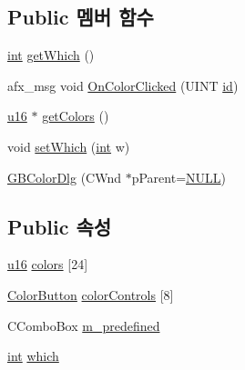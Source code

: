 \subsection*{Public 멤버 함수}
\begin{DoxyCompactItemize}
\item 
\mbox{\hyperlink{_util_8cpp_a0ef32aa8672df19503a49fab2d0c8071}{int}} \mbox{\hyperlink{class_g_b_color_dlg_a8f4e8dbf15d1f2d1bab9df384ebf484e}{get\+Which}} ()
\item 
afx\+\_\+msg void \mbox{\hyperlink{class_g_b_color_dlg_a244aa29f38fa1e813aca166ba63982c6}{On\+Color\+Clicked}} (U\+I\+NT \mbox{\hyperlink{_commands_8cpp_a7b7a6396b2c82ad46c6d8b2bf141a8dd}{id}})
\item 
\mbox{\hyperlink{_system_8h_a9e6c91d77e24643b888dbd1a1a590054}{u16}} $\ast$ \mbox{\hyperlink{class_g_b_color_dlg_ab3fe3dff45003cb0483ad90eb42a3052}{get\+Colors}} ()
\item 
void \mbox{\hyperlink{class_g_b_color_dlg_a1e00eaaeaf344a830f1dd5692e26af1d}{set\+Which}} (\mbox{\hyperlink{_util_8cpp_a0ef32aa8672df19503a49fab2d0c8071}{int}} w)
\item 
\mbox{\hyperlink{class_g_b_color_dlg_a57ebd7e910414cd9c33725faf038afcb}{G\+B\+Color\+Dlg}} (C\+Wnd $\ast$p\+Parent=\mbox{\hyperlink{_system_8h_a070d2ce7b6bb7e5c05602aa8c308d0c4}{N\+U\+LL}})
\end{DoxyCompactItemize}
\subsection*{Public 속성}
\begin{DoxyCompactItemize}
\item 
\mbox{\hyperlink{_system_8h_a9e6c91d77e24643b888dbd1a1a590054}{u16}} \mbox{\hyperlink{class_g_b_color_dlg_a24de2e906e28d7b4a006d68d6c8afeee}{colors}} \mbox{[}24\mbox{]}
\item 
\mbox{\hyperlink{class_color_button}{Color\+Button}} \mbox{\hyperlink{class_g_b_color_dlg_a7b80bc0f290c7f26e84283dc7c457240}{color\+Controls}} \mbox{[}8\mbox{]}
\item 
C\+Combo\+Box \mbox{\hyperlink{class_g_b_color_dlg_abd7ea64ca037d12cec0615ef7872c66b}{m\+\_\+predefined}}
\item 
\mbox{\hyperlink{_util_8cpp_a0ef32aa8672df19503a49fab2d0c8071}{int}} \mbox{\hyperlink{class_g_b_color_dlg_a8f7bbf1c4a4ffe4a6c57454b9087ff28}{which}}
\end{DoxyCompactItemize}
